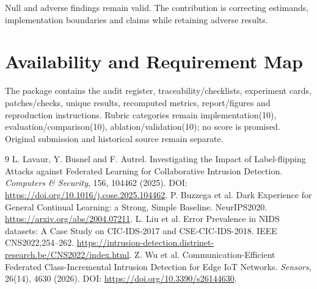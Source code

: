 \documentclass[10pt,a4paper]{article}
\begin{document}
Null and adverse findings remain valid. The contribution is correcting estimands, implementation boundaries and claims while retaining adverse results.

\section*{Availability and Requirement Map}
The package contains the audit register, traceability/checklists, experiment cards, patches/checks, unique results, recomputed metrics, report/figures and reproduction instructions. Rubric categories remain implementation(10), evaluation/comparison(10), ablation/validation(10); no score is promised. Original submission and historical source remain separate.

\begingroup\footnotesize
\begin{thebibliography}{9}\setlength{\itemsep}{0pt}
 L. Lavaur, Y. Busnel and F. Autrel. Investigating the Impact of Label-flipping Attacks against Federated Learning for Collaborative Intrusion Detection. \textit{Computers \& Security}, 156, 104462 (2025). DOI: \url{https://doi.org/10.1016/j.cose.2025.104462}.
 P. Buzzega et al. Dark Experience for General Continual Learning: a Strong, Simple Baseline. NeurIPS2020. \url{https://arxiv.org/abs/2004.07211}.
 L. Liu et al. Error Prevalence in NIDS datasets: A Case Study on CIC-IDS-2017 and CSE-CIC-IDS-2018. IEEE CNS2022,254--262. \url{https://intrusion-detection.distrinet-research.be/CNS2022/index.html}.
 Z. Wu et al. Communication-Efficient Federated Class-Incremental Intrusion Detection for Edge IoT Networks. \textit{Sensors}, 26(14), 4630 (2026). DOI: \url{https://doi.org/10.3390/s26144630}.
\end{thebibliography}
\endgroup
\end{document}
